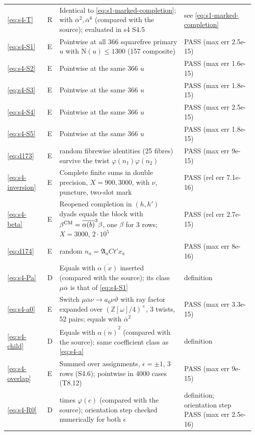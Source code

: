\documentclass[11pt]{article}
\numberwithin{equation}{section}
\newcommand{\OO}{\mathbb Z[\omega]}
\newcommand{\N}{\mathrm N}
\begin{document}
\begin{longtable}{@{}>{\raggedright\arraybackslash}p{1.2cm}>{\centering\arraybackslash}p{0.7cm}>{\raggedright\arraybackslash}p{9.05cm}>{\raggedright\arraybackslash}p{4.3cm}@{}}
\eqref{eq:s4-T} & R & Identical to \eqref{eq:s1-marked-completion}; \cite[eq.~(14.2)]{OAI78} with $\overline\alpha^2,\overline\alpha^6$ (compared with the source); evaluated in s4 S4.5 & see \eqref{eq:s1-marked-completion}\\
\eqref{eq:s4-S1} & E & Pointwise at all 366 squarefree primary $u$ with $\N(u)\le1300$ (157 composite) & PASS (max err 2.5e-15)\\
\eqref{eq:s4-S2} & E & Pointwise at the same 366 $u$ & PASS (max err 1.6e-15)\\
\eqref{eq:s4-S3} & E & Pointwise at the same 366 $u$ & PASS (max err 1.8e-15)\\
\eqref{eq:s4-S4} & E & Pointwise at the same 366 $u$ & PASS (max err 2.5e-15)\\
\eqref{eq:s4-S5} & E & Pointwise at the same 366 $u$ & PASS (max err 1.8e-15)\\
\eqref{eq:d173} & E & 20 random fibrewise identities (25 fibres) survive the twist $\varphi(n_1)\overline{\varphi(n_2)}$ & PASS (max err 9e-15)\\
\eqref{eq:s4-inversion} & E & Complete finite sums in double precision, $X=900,3000$, with $\nu$, puncture, two-slot mark & PASS (rel err 7.1e-16)\\
\eqref{eq:s4-beta} & E & Reopened completion in $(h,h')$ dyads equals the block with $\beta^{\rm CM}=\overline{\alpha(b)}^3\beta$, one $\beta$ for 3 rows; $X=3000$, $2\cdot10^5$ & PASS (rel err 2.7e-15)\\
\eqref{eq:d174} & E & 3000 random $n_a=\mathfrak A_aCt'x_a$ & PASS (max err 8e-16)\\
\eqref{eq:s4-Pa} & D & Equals \cite[eq.~(17.30)]{OAI78} with $\overline{\alpha(x)}$ inserted (compared with the source); its class $\mu\overline\alpha$ is that of \eqref{eq:s4-S1} & definition\\
\eqref{eq:s4-a0} & E & Switch $\mu\overline\alpha\nu\to a_0\nu\overline\vartheta$ with ray factor expanded over $(\OO/4)^\times$, 3 twists, 52 pairs; equals \cite{OAI78} with $\overline\alpha^2$ & PASS (max err 3.3e-15)\\
\eqref{eq:s4-child} & D & Equals \cite[eq.~(17.55)]{OAI78} with $\overline{\alpha(n)}^2$ (compared with the source); same coefficient class as \eqref{eq:s4-a} & definition\\
\eqref{eq:s4-overlap} & E & Summed over assignments, $\epsilon=\pm1$, 3 rows (S4.6); pointwise in 4000 cases (T8.12) & PASS (max err 9e-15)\\
\eqref{eq:s4-R0} & D & \cite[eq.~(17.68)]{OAI78} times $\varphi(c)$ (compared with the source); orientation step checked numerically for both $\epsilon$ & definition; orientation step PASS (max err 2.5e-16)\\

\end{longtable}
\end{document}
